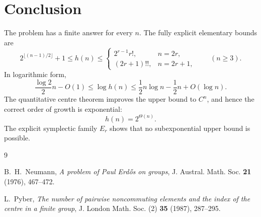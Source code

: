 \documentclass[11pt]{article}
\theoremstyle{definition}
\begin{document}
\section{Conclusion}

The problem has a finite answer for every $n$.  The fully explicit elementary bounds are
\[
 2^{\lfloor(n-1)/2\rfloor}+1
 \le h(n)
 \le
 \begin{cases}
 2^{r-1}r!,&n=2r,\\[2mm]
 (2r+1)!!,&n=2r+1,
 \end{cases}
 \qquad(n\ge3).
\]
In logarithmic form,
\[
 \frac{\log2}{2}n-O(1)
 \le\log h(n)
 \le\frac12n\log n-\frac12n+O(\log n).
\]
The quantitative centre theorem improves the upper bound to $C^n$, and hence the correct order of growth is exponential:
\[
 \boxed{h(n)=2^{\Theta(n)}}.
\]
The explicit symplectic family $E_r$ shows that no subexponential upper bound is possible.

\begin{thebibliography}{9}

B.~H.~Neumann,
\emph{A problem of Paul Erd\H{o}s on groups},
J. Austral. Math. Soc. \textbf{21} (1976), 467--472.

L.~Pyber,
\emph{The number of pairwise noncommuting elements and the index of the centre in a finite group},
J. London Math. Soc. (2) \textbf{35} (1987), 287--295.

\end{thebibliography}
\end{document}

